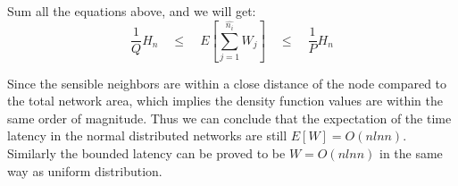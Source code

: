Sum all the equations above, and we will get:
$$
\frac{1}{Q}H_n  \quad \leq \quad E[\sum_{j=1}^{\hat{n_i}}W_j]  \quad \leq \quad \frac{1}{P}H_n
$$


Since the sensible neighbors are within a close distance of the node 
compared to the total network area, 
which implies the density function values are within the same order of magnitude.
Thus we can conclude that the expectation of the time latency in the normal 
distributed networks are still $E[W]=O(nlnn)$.
Similarly the bounded latency can be proved to be $W=O(nlnn)$ in the same way as
uniform distribution.


